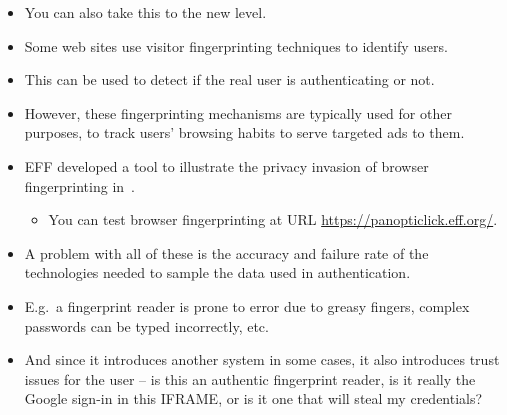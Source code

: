 \begin{frame}
  \begin{itemize}
    \item You can also take this to the new level.

    \item Some web sites use visitor fingerprinting techniques to identify 
      users.

    \item This can be used to detect if the real user is authenticating or not.

    \item However, these fingerprinting mechanisms are typically used for other 
      purposes, to track users' browsing habits to serve targeted ads to them.

    \item EFF developed a tool to illustrate the privacy invasion of browser 
      fingerprinting in~\cite{Eckersley2010hui}.
      \begin{itemize}
        \item You can test browser fingerprinting at URL 
          \url{https://panopticlick.eff.org/}.
      \end{itemize}

  \end{itemize}
\end{frame}

\begin{frame}
  \begin{itemize}
    \item A problem with all of these is the accuracy and failure rate of the 
      technologies needed to sample the data used in authentication.

    \item E.g.\ a fingerprint reader is prone to error due to greasy fingers, 
      complex passwords can be typed incorrectly, etc.

    \item And since it introduces another system in some cases, it also 
      introduces trust issues for the user -- is this an authentic fingerprint 
      reader, is it really the Google sign-in in this IFRAME, or is it one that 
      will steal my credentials?

  \end{itemize}
\end{frame}


